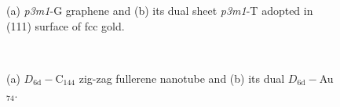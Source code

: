 \begin{figure}[htb]
\begin{center}
	\hspace{.05\textwidth}
\caption{(a) \textit{p3m1}-G graphene and (b) its dual sheet \textit{p3m1}-T adopted in (111) surface of fcc gold.}
\label{fig:graphenedual}
\end{center}
\end{figure}

\begin{figure}[htb]
\begin{center}
	 \\
	\caption{(a) $D_\mathrm{6d}-$C$_{144}$ zig-zag fullerene nanotube and (b) its dual $D_\mathrm{6d}-$Au$_{74}$.}
\label{fig:nanotubedual}
\end{center}
\end{figure}

